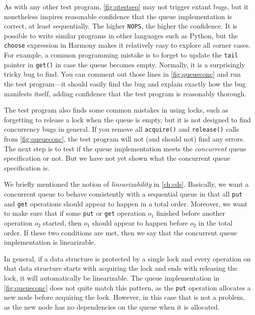 \documentclass{report}
\begin{document}
As with any other test program,
\autoref{fig:qtestseq} may not trigger extant bugs, but
it nonetheless inspires reasonable confidence that the
queue implementation is correct, at least sequentially.
The higher \texttt{NOPS}, the higher the confidence.
It is possible to write similar programs in other languages
such as Python, but the \texttt{choose} expression in Harmony
makes it relatively easy to explore all corner cases.
%
For example, a common programming mistake is to forget to
update the \texttt{tail} pointer in \texttt{get()} in case
the queue becomes empty.  Normally, it is a surprisingly
tricky bug to find.  You can comment out those lines
in \autoref{fig:queueconc} and run the test program---it should
easily find the bug and explain exactly how
the bug manifests itself, adding confidence that the test program
is reasonably thorough.

The test program also finds some common mistakes in using
locks, such as forgetting to release a lock when the queue
is empty, but it is not designed to find concurrency bugs
in general.  If you remove all \texttt{acquire()} and
\texttt{release()} calls from \autoref{fig:queueconc},
the test program will not (and should not)
find any errors.
The next step is to test if the queue implementation
meets the \emph{concurrent} queue specification or not.
But we have not yet shown what the
concurrent queue specification is.

We briefly mentioned the notion of \emph{linearizability}
in \autoref{ch:cds}.
Basically, we want a concurrent queue to behave
consistently with a sequential queue in that all
\texttt{put}
and \texttt{get} operations should appear to happen
in a total order.
Moreover, we want to make sure that if some
\texttt{put} or \texttt{get} operation $o_1$ finished
before another operation $o_2$ started, then $o_1$
should appear to happen before $o_2$ in the total order.
If these two conditions are met, then we say that
the concurrent queue implementation is linearizable.

In general, if a data structure is protected by
a single lock and every operation on that data
structure starts with acquiring the lock and ends
with releasing the lock, it will automatically be
linearizable.
The queue implementation in \autoref{fig:queueconc} does
not quite match this pattern, as the \texttt{put}
operation allocates a new node before acquiring
the lock.
However, in this case that is not a problem, as
the new node has no dependencies on the queue
when it is allocated.
\end{document}
